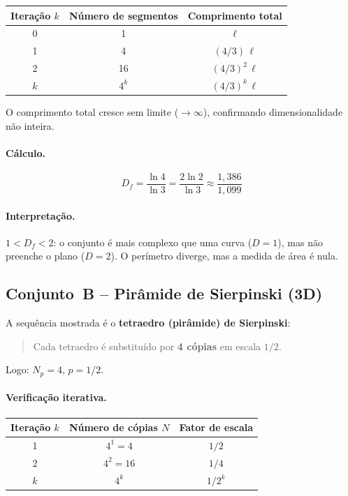 \documentclass[12pt,a4paper]{article}
\theoremstyle{definition}
\newcommand{\resultado}[1]{%
  \begin{center}
    \fbox{\parbox{0.85\linewidth}{\centering $\displaystyle #1$}}
  \end{center}
}
\begin{document}
\begin{center}
\begin{tabular}{ccc}
\toprule
Itera\c{c}\~ao $k$ & N\'umero de segmentos & Comprimento total\\
\midrule
0 & 1             & $\ell$ \\
1 & 4             & $(4/3)\,\ell$ \\
2 & 16            & $(4/3)^2\,\ell$ \\
$k$ & $4^k$       & $(4/3)^k\,\ell$ \\
\bottomrule
\end{tabular}
\end{center}

O comprimento total cresce sem limite ($\to\infty$), confirmando dimensionalidade
n\~ao inteira.

\paragraph{C\'alculo.}
\begin{equation}
  D_f = \frac{\ln 4}{\ln 3}
      = \frac{2\ln 2}{\ln 3}
      \approx \frac{1{,}386}{1{,}099}
\end{equation}
\resultado{D_f \approx 1{,}26}

\paragraph{Interpreta\c{c}\~ao.}
$1 < D_f < 2$: o conjunto \'e mais complexo que uma curva ($D=1$), mas n\~ao
preenche o plano ($D=2$).
O per\'imetro diverge, mas a medida de \'area \'e nula.

\subsection{Conjunto~B -- Pir\^amide de Sierpinski (3D)}

A sequ\^encia mostrada \'e o \textbf{tetraedro (pir\^amide) de Sierpinski}:
\begin{quote}
  Cada tetraedro \'e substitu\'ido por \textbf{4 c\'opias} em escala $1/2$.
\end{quote}
Logo: $N_p = 4$, $p = 1/2$.

\paragraph{Verifica\c{c}\~ao iterativa.}
\begin{center}
\begin{tabular}{ccc}
\toprule
Itera\c{c}\~ao $k$ & N\'umero de c\'opias $N$ & Fator de escala\\
\midrule
1 & $4^1 = 4$    & $1/2$ \\
2 & $4^2 = 16$   & $1/4$ \\
$k$ & $4^k$      & $1/2^k$ \\
\bottomrule
\end{tabular}
\end{center}
\end{document}
